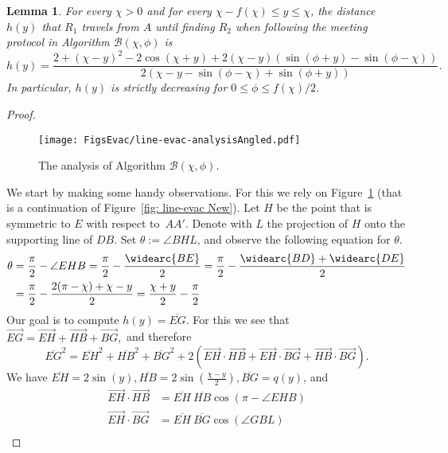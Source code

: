 \documentclass[
final
]{dmtcs-episciences}
\newcommand{\barr}[1]{\overline{#1}}
\newcommand{\vect}[1]{\overrightarrow{#1}}
\newcommand{\sinn}[1]{\sin \left({#1}\right)}
\newcommand{\coss}[1]{\cos \left({#1}\right)}
\newcommand{\RA}{\ensuremath{R_1}}
\newcommand{\RB}{\ensuremath{R_2 }}
\newcommand{\arccc}[1]{
\widearc{#1}
}
\newtheorem{lemma}[theorem]{Lemma}
\theoremstyle{definition}
\begin{document}
\begin{lemma}\label{lem: calculation of h, line interior}
	For every $\chi>0$ and for every $\chi -f(\chi) \leq y \leq \chi$, the distance $h(y)$ that $\RA$ travels from $A$ until finding $\RB$ when following the meeting protocol in Algorithm $\mathcal B(\chi, \phi)$ is 
$$
h(y)=
\frac{
2+(\chi-y)^2 - 2\cos(\chi+y) + 2 (\chi-y) \left(\sin (\phi+y)- \sin (\phi-\chi) \right)
}{2 (\chi-y-\sin (\phi-\chi)+\sin (\phi+y))}.
$$
In particular, $h(y)$ is strictly decreasing for $0\leq \phi \leq f(\chi)/2$. 
\end{lemma}

\begin{proof}
\begin{figure}[thb]
                \centering
                \texttt{[image: FigsEvac/line-evac-analysisAngled.pdf]}
                \caption{The analysis of Algorithm $\mathcal B(\chi, \phi)$. }
                \label{fig: line-evac-analysisAngled}
\end{figure}
We start by making some handy observations. 
For this we rely on Figure~\ref{fig: line-evac-analysisAngled} (that is a continuation of Figure~\ref{fig: line-evac New}). 
Let $H$ be the point that is symmetric to $E$ with respect to~$AA'$. 
Denote with $L$ the projection of $H$ onto the supporting line of $DB$. 
Set $\theta:=\angle{BHL}$, and observe the following equation for $\theta$.
\begin{align}
\theta &= \notag
\frac \pi 2 - \angle{EHB}
= \frac \pi 2 - \frac{\arccc{BE}}{2} 
= \frac \pi 2 - \frac{\arccc{BD}+\arccc{DE}}{2}\\
&= \label{equa: value of theta}
\frac \pi 2 - \frac{2(\pi-\chi)+\chi-y}{2}
=\frac{\chi+y}{2}-\frac{\pi}{2}
\end{align}
Our goal is to compute $h(y)=\barr{EG}$. For this we see that
$
\vect{EG}=\vect{EH}+\vect{HB}+\vect{BG},
$
and therefore
\begin{equation}\label{equa: inner products line algo}
\barr{EG}^2=\barr{EH}^2+\barr{HB}^2+\barr{BG}^2 
+ 2\left(
\vect{EH}\cdot\vect{HB}+
\vect{EH}\cdot\vect{BG}+
\vect{HB}\cdot\vect{BG}
\right).
\end{equation}
We have
$\barr{EH}=2\sinn{y}, \barr{HB}= 2\sinn{\frac{\chi-y}2}, \barr{BG}=q(y)$, 
and
\begin{align*}
\vect{EH}\cdot\vect{HB} &= 
\barr{EH} ~\barr{HB} \coss{\pi - \angle{EHB}}
\\
\vect{EH}\cdot\vect{BG} &=
\barr{EH} ~\barr{BG} \coss{\angle{GBL}}
\\

\end{align*}
\end{proof}
\end{document}
